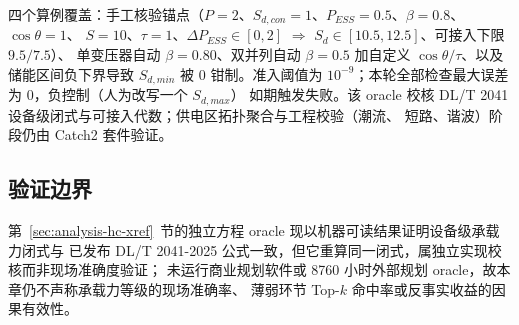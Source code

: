 四个算例覆盖：手工核验锚点（$P{=}2$、$S_{d,con}{=}1$、$P_{ESS}{=}0.5$、$\beta{=}0.8$、$\cos\theta{=}1$、
$S{=}10$、$\tau{=}1$、$\Delta P_{ESS}\in[0,2]$ $\Rightarrow$ $S_d\in[10.5,12.5]$、可接入下限 $9.5/7.5$）、
单变压器自动 $\beta{=}0.80$、双并列自动 $\beta{=}0.5$ 加自定义 $\cos\theta/\tau$、以及储能区间负下界导致
$S_{d,min}$ 被 $0$ 钳制。准入阈值为 $10^{-9}$；本轮全部检查最大误差为 $0$，负控制（人为改写一个 $S_{d,max}$）
如期触发失败。该 oracle 校核 DL/T 2041 设备级闭式与可接入代数；供电区拓扑聚合与工程校验（潮流、
短路、谐波）阶段仍由 Catch2 套件验证。

\subsection{验证边界}
第~\ref{sec:analysis-hc-xref}~节的独立方程 oracle 现以机器可读结果证明设备级承载力闭式与
已发布 DL/T 2041-2025 公式一致，但它重算同一闭式，属独立实现校核而非现场准确度验证；
未运行商业规划软件或 8760 小时外部规划 oracle，故本章仍不声称承载力等级的现场准确率、
薄弱环节 Top-$k$ 命中率或反事实收益的因果有效性。
